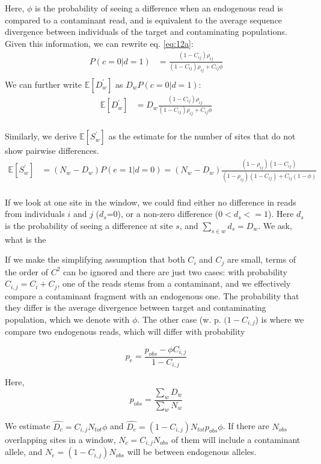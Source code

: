 \documentclass[12pt, letterpaper]{article}
\begin{document}
Here, $\phi$ is the probability of seeing a difference when an endogenous read is compared to a contaminant read, and is equivalent to the average sequence divergence between individuals of the target and contaminating populations.
Given this information, we can rewrite eq. \ref{eq:12a}:
\begin{align}\label{eq:12}
    P(c=0|d=1) &= \frac{(1 - C_{ij}) \rho_{ij}}{(1 - C_{ij}) \rho_{ij} + C_{ij} \phi} \nonumber\\
\end{align}
We can further write $\mathbb{E}[D_w^{'}]$ as $D_w P(c=0|d=1)$:
\begin{align}
    \mathbb{E}[D_w^{'}] &= D_w\frac{(1-C_{ij})\rho_{ij}}{(1-C_{ij}) \rho_{ij} + C_{ij} \phi}\\
\end{align}

Similarly, we derive $\mathbb{E}[S_w^{'}]$ as the estimate for the number of sites that do not show pairwise differences.
\begin{align}
    \mathbb{E}[S_w^{'}] &= (N_w-D_w) P(e=1|d=0) = (N_w - D_w)\frac{(1-\rho_{ij})(1-C_{ij})}{(1-\rho_{ij})(1-C_{ij}) + C_{ij}(1-\phi)}\\
\end{align}

If we look at one site in the window, we could find either no difference in reads from individuals $i$ and $j$ ($d_s$=0), or a non-zero difference ($0<d_s<=1$). Here $d_s$ is the probability of seeing a difference at site $s$, and $\sum_{s \in w} d_s =D_w$. We ask, what is the    

If we make the simplifying assumption that both $C_i$ and $C_j$ are small, terms of the order of $C^2$ can be ignored and there are just two cases: with probability $C_{i,j} =C_i + C_j$, one of the reads stems from a contaminant, and we effectively compare a contaminant fragment with an endogenous one. The probability that they differ is the average divergence between target and contaminating population, which we denote with $\phi$. The other case (w. p. $(1-C_{i,j}$) is where we compare two endogenous reads, which will differ with probability

\begin{equation}
    p_{e} = \frac{p_{obs}-\phi C_{i,j}}{1-C_{i,j}}
\end{equation}

Here, $$p_{obs} = \frac{\sum_w D_w}{\sum_w N_w}$$


We estimate $\hat{D_c} = C_{i,j} N_{tot} \phi$ and $\hat{D_e} = (1-C_{i,j}) N_{tot} p_{obs}\phi$.
If there are $N_{obs}$ overlapping sites in a window, $N_{c} = C_{i,j}N_{obs}$ of them will include a contaminant allele, and $N_e = (1-C_{i,j})N_{obs}$ will be between endogenous alleles.
\end{document}
